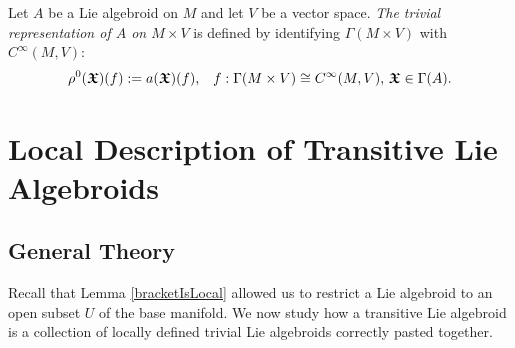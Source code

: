 
\begin{definition}
Let $A$ be a Lie algebroid on $M$ and let $V$ be a vector space. \emph{The trivial representation of $A$ on $M \times V$} is defined by identifying $\Gamma(M \times V)$ with $C^\infty(M, V)$:
\begin{align*}
    \rho^0(\bm{\mathfrak{X}})(f) := a(\bm{\mathfrak{X}})(f), && f: \Gamma(M \times V) \cong C^\infty(M, V),\, \bm{\mathfrak{X}} \in \Gamma(A).
\end{align*}
\end{definition}


\section{Local Description of Transitive Lie Algebroids}

\subsection{General Theory}

Recall that Lemma \ref{bracketIsLocal} allowed us to restrict a Lie algebroid to an open subset $U$ of the base manifold. We now study how a transitive Lie algebroid is a collection of locally defined trivial Lie algebroids correctly pasted together.

